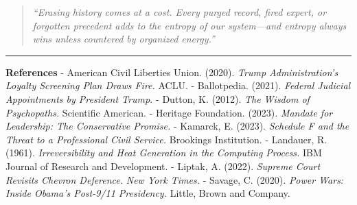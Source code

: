 \begin{quote}
\emph{``Erasing history comes at a cost. Every purged record, fired
expert, or forgotten precedent adds to the entropy of our system---and
entropy always wins unless countered by organized energy.''}
\end{quote}

\begin{center}\rule{0.5\linewidth}{0.5pt}\end{center}

\textbf{References} - American Civil Liberties Union. (2020).
\emph{Trump Administration's Loyalty Screening Plan Draws Fire.} ACLU. -
Ballotpedia. (2021). \emph{Federal Judicial Appointments by President
Trump.} - Dutton, K. (2012). \emph{The Wisdom of Psychopaths.}
Scientific American. - Heritage Foundation. (2023). \emph{Mandate for
Leadership: The Conservative Promise.} - Kamarck, E. (2023).
\emph{Schedule F and the Threat to a Professional Civil Service.}
Brookings Institution. - Landauer, R. (1961). \emph{Irreversibility and
Heat Generation in the Computing Process.} IBM Journal of Research and
Development. - Liptak, A. (2022). \emph{Supreme Court Revisits Chevron
Deference.} \emph{New York Times.} - Savage, C. (2020). \emph{Power
Wars: Inside Obama's Post-9/11 Presidency.} Little, Brown and Company.
